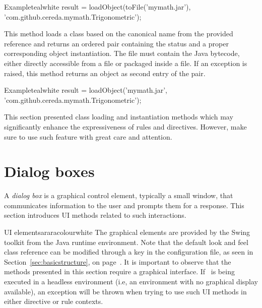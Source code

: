 \begin{description}
\begin{codebox}{Example}{teal}{\icnote}{white}
result = loadObject(toFile('mymath.jar'),
         'com.github.cereda.mymath.Trigonometric');
\end{codebox}

\item[\mddbox{C}{R}{\parbox{0.32\textwidth}{loadObject(String ref,\\ \hspace*{1em}String name)}}{\parbox{0.43\textwidth}{Pair<ClassLoading.\\
\hspace*{1em}ClassLoadingStatus, Object>}}] This method loads a class based on the canonical name from the provided  reference and returns an ordered pair containing the status and a proper corresponding object instantiation. The file must contain the Java bytecode, either directly accessible from a  file or packaged inside a  file. If an exception is raised, this method returns an  object as second entry of the pair.

\begin{codebox}{Example}{teal}{\icnote}{white}
result = loadObject('mymath.jar',
         'com.github.cereda.mymath.Trigonometric');
\end{codebox}
\end{description}

This section presented class loading and instantiation methods which may significantly enhance the expressiveness of rules and directives. However, make sure to use such feature with great care and attention.

\section{Dialog boxes}
\label{sec:dialogboxes}

A \emph{dialog box} is a graphical control element, typically a small window, that communicates information to the user and prompts them for a response. This section introduces UI methods related to such interactions.

\begin{messagebox}{UI elements}{araracolour}{\icok}{white}
The graphical elements are provided by the Swing toolkit from the Java runtime environment. Note that the default look and feel class reference can be modified through a key in the configuration file, as seen in Section~\ref{sec:basicstructure}, on page~\pageref{sec:basicstructure}. It is important to observe that the methods presented in this section require a graphical interface. If \arara\ is being executed in a headless environment (i.e, an environment with no graphical display available), an exception will be thrown when trying to use such UI methods in either directive or rule contexts.
\end{messagebox}

